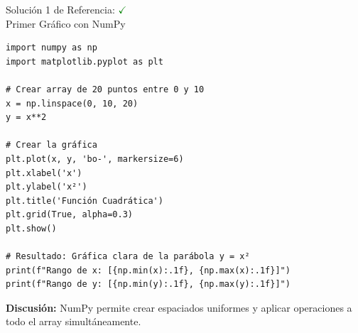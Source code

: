 \documentclass[10pt]{beamer}
\begin{document}
\ifshowsolutions
\begin{frame}[fragile]{Solución 1 de Referencia: \hfill \textcolor{green}{$\checkmark$} \\ Primer Gráfico con NumPy}
\begin{verbatim}
import numpy as np
import matplotlib.pyplot as plt

# Crear array de 20 puntos entre 0 y 10
x = np.linspace(0, 10, 20)
y = x**2

# Crear la gráfica
plt.plot(x, y, 'bo-', markersize=6)
plt.xlabel('x')
plt.ylabel('x²')
plt.title('Función Cuadrática')
plt.grid(True, alpha=0.3)
plt.show()

# Resultado: Gráfica clara de la parábola y = x²
print(f"Rango de x: [{np.min(x):.1f}, {np.max(x):.1f}]")
print(f"Rango de y: [{np.min(y):.1f}, {np.max(y):.1f}]")
\end{verbatim}
\textbf{Discusión:} NumPy permite crear espaciados uniformes y aplicar operaciones a todo el array simultáneamente.
\end{frame}
\end{document}
